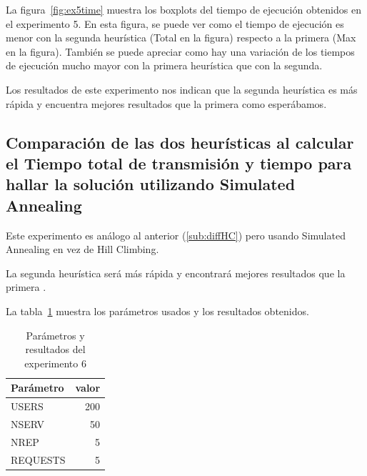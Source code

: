 La figura~\ref{fig:ex5time} muestra los boxplots del tiempo de ejecución obtenidos en el experimento 5.
En esta figura, se puede ver como el tiempo de ejecución es menor con la segunda heurística (Total en la
figura) respecto a la primera (Max en la figura).
También se puede apreciar como hay una variación de los tiempos de ejecución mucho mayor con la primera
heurística que con la segunda.

Los resultados de este experimento nos indican que la segunda heurística es más rápida y encuentra mejores
resultados que la primera como esperábamos.

\pagebreak
\subsection{Comparación de las dos heurísticas al calcular el Tiempo total de transmisión y tiempo para hallar la solución utilizando Simulated Annealing}%
\label{sub:exp6}

Este experimento es análogo al anterior (\ref{sub:diffHC}) pero usando Simulated Annealing en vez de Hill Climbing.

\begin{hyp*}
La segunda heurística será más rápida y encontrará mejores resultados que la primera .
\end{hyp*}

La tabla~\ref{tab:ex6} muestra los parámetros usados y los resultados obtenidos.

\begin{table}[H]
    \caption{Parámetros y resultados del experimento 6}%
    \label{tab:ex6}
    \begin{center}
    \begin{tabular}{lr}
    \toprule
    Parámetro & valor \\
    \midrule
    USERS & 200 \\
    NSERV & 50 \\
    NREP & 5 \\
    REQUESTS & 5\\
    \bottomrule
    \end{tabular}
    \hspace{2em}
    
    \end{center}
\end{table}

